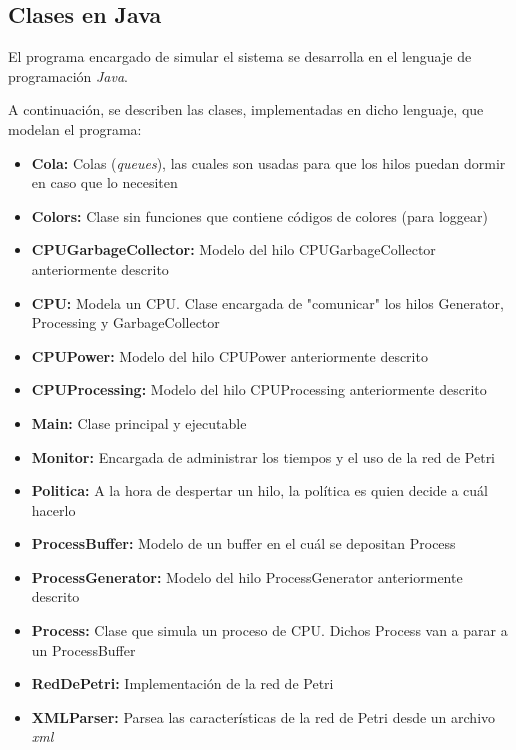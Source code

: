 \documentclass{article}
\begin{document}
    \subsection{Clases en Java}
    El programa encargado de simular el sistema se desarrolla en el lenguaje de programación
    \emph{Java}. \par
    A continuación, se describen las clases, implementadas en dicho lenguaje,
    que modelan el programa:
    \begin{itemize}
        \item \textbf{Cola:} Colas (\emph{queues}), las cuales son usadas para que los
        hilos puedan dormir en caso que lo necesiten
        \item \textbf{Colors:} Clase sin funciones que contiene códigos de colores (para 
        loggear)
        \item \textbf{CPUGarbageCollector:} Modelo del hilo CPUGarbageCollector anteriormente
        descrito
        \item \textbf{CPU:} Modela un CPU. Clase encargada de "comunicar" los hilos Generator,
        Processing y GarbageCollector
        \item \textbf{CPUPower:} Modelo del hilo CPUPower anteriormente descrito
        \item \textbf{CPUProcessing:} Modelo del hilo CPUProcessing anteriormente descrito
        \item \textbf{Main:} Clase principal y ejecutable
        \item \textbf{Monitor:} Encargada de administrar los tiempos y el uso de la red de 
        Petri
        \item \textbf{Politica:} A la hora de despertar un hilo, la política es quien decide
        a cuál hacerlo
        \item \textbf{ProcessBuffer:} Modelo de un buffer en el cuál se depositan Process
        \item \textbf{ProcessGenerator:} Modelo del hilo ProcessGenerator anteriormente
        descrito
        \item \textbf{Process:} Clase que simula un proceso de CPU. Dichos Process van a
        parar a un ProcessBuffer
        \item \textbf{RedDePetri:} Implementación de la red de Petri
        \item \textbf{XMLParser:} Parsea las características de la red de Petri desde un
        archivo \emph{xml}
    \end{itemize} \par
\end{document}
